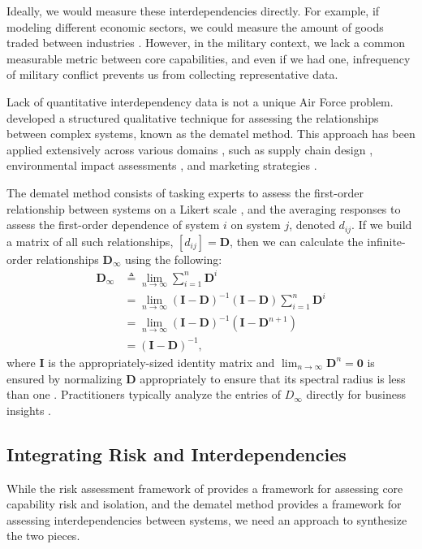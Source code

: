 \documentclass{article}
\begin{document}
Ideally, we would measure these interdependencies directly. For example, if modeling different economic sectors, we could measure the amount of goods traded between industries \citep{leontief1986input}. However, in the military context, we lack a common measurable metric between core capabilities, and even if we had one, infrequency of military conflict prevents us from collecting representative data.

Lack of quantitative interdependency data is not a unique Air Force problem. \citet{dematel} developed a structured qualitative technique for assessing the relationships between complex systems, known as the \ac{dematel} method. This approach has been applied extensively across various domains \citep{dematel-overview}, such as supply chain design \citep{dematel-chiou}, environmental impact assessments \citep{dematel-green}, and marketing strategies \citep{dematel-chiu}.

The \ac{dematel} method consists of tasking experts to assess the first-order relationship between systems on a Likert scale \citep{likert}, and the averaging responses to assess the first-order dependence of system $i$ on system $j$, denoted $d_{ij}$. If we build a matrix of all such relationships, $[d_{ij}] = \mathbf{D}$, then we can calculate the infinite-order relationships $\mathbf{D}_\infty$ using the following: 
\begin{equation}
\begin{aligned}
\label{eqn:dematel}
\mathbf{D}_\infty & \triangleq \lim_{n \rightarrow \infty} \sum_{i=1}^n \mathbf{D}^i \\
& = \lim_{n \rightarrow \infty} (\mathbf{I}-\mathbf{D})^{-1}(\mathbf{I}-\mathbf{D})\sum_{i=1}^n \mathbf{D}^i \\
& = \lim_{n \rightarrow \infty} (\mathbf{I}-\mathbf{D})^{-1}(\mathbf{I}-\mathbf{D}^{n+1})\\
& = (\mathbf{I}-\mathbf{D})^{-1},
\end{aligned}
\end{equation}
where $\mathbf{I}$ is the appropriately-sized identity matrix and $\lim_{n\rightarrow \infty} \mathbf{D}^n=\mathbf{0}$ is ensured by normalizing $\mathbf{D}$ appropriately to ensure that its spectral radius is less than one \citep{dematel-overview}. Practitioners typically analyze the entries of $D_\infty$ directly for business insights \citep{dematel-overview, dematel-chiu, dematel-chiou}. 


\subsection{Integrating Risk and Interdependencies}
While the risk assessment framework of \citet{gallagher2016improving} provides a framework for assessing core capability risk and isolation, and the \ac{dematel} method provides a framework for assessing interdependencies between systems, we need an approach to synthesize the two pieces.
\end{document}
